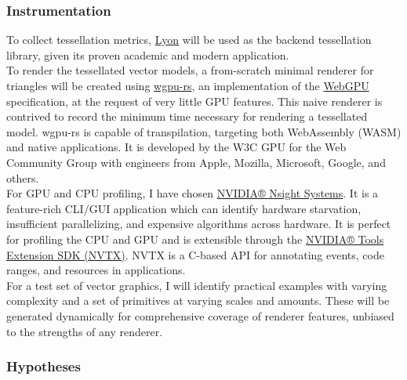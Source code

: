 \subsubsection{Instrumentation}

To collect tessellation metrics, \href{https://github.com/nical/lyon}{Lyon} will be used as the backend tessellation library, given its proven academic and modern application.\\

To render the tessellated vector models, a from-scratch minimal renderer for triangles will be created using \href{https://wgpu.rs/}{wgpu-rs}, an implementation of the \href{https://www.w3.org/community/gpu/}{WebGPU} specification, at the request of very little GPU features. This naive renderer is contrived to record the minimum time necessary for rendering a tessellated model. wgpu-rs is capable of transpilation, targeting both WebAssembly (WASM) and native applications. It is developed by the W3C GPU for the Web Community Group with engineers from Apple, Mozilla, Microsoft, Google, and others\cite{WebGPU}.\\

For GPU and CPU profiling, I have chosen \href{https://developer.nvidia.com/nsight-systems}{NVIDIA® Nsight Systems}. It is a feature-rich CLI/GUI application which can identify hardware starvation, insufficient parallelizing, and expensive algorithms across hardware. It is perfect for profiling the CPU and GPU and is extensible through the \href{https://docs.nvidia.com/gameworks/content/gameworkslibrary/nvtx/nvidia_tools_extension_library_nvtx.htm}{NVIDIA® Tools Extension SDK (NVTX)}. NVTX is a C-based API for annotating events, code ranges, and resources in applications.\\

For a test set of vector graphics, I will identify practical examples with varying complexity and a set of primitives at varying scales and amounts. These will be generated dynamically for comprehensive coverage of renderer features, unbiased to the strengths of any renderer.

\subsubsection{Hypotheses}

